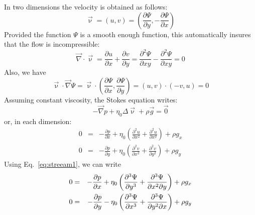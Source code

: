 In two dimensions the velocity is obtained as follows:
\begin{equation}
{\vec \upnu} = (u,v) = \left( \frac{\partial \Psi}{\partial y},-\frac{\partial \Psi}{\partial x} \right) 
\label{eq:streeam1}
\end{equation}
Provided the function $\Psi$ is a smooth enough function, 
this automatically insures that the flow is incompressible:
\begin{equation}
{\vec \nabla}\cdot {\vec \upnu} = 
\frac{\partial u}{\partial x} + \frac{\partial v}{\partial y}
=
\frac{\partial^2 \Psi}{\partial xy} - \frac{\partial^2 \Psi}{\partial xy} =0 
\end{equation}
Also, we have
\[
\vec\upnu \cdot \vec\nabla \Psi = \vec\upnu \cdot
\left( \frac{\partial \Psi}{\partial x},\frac{\partial \Psi}{\partial y} \right) 
=(u,v) \cdot (-v,u) =0
\]
Assuming constant viscosity, the Stokes equation writes:
\begin{equation}
-{\vec \nabla}p + \eta_0 \Delta {\vec \upnu} + \rho {\vec g} = \vec{0}
\end{equation}
or, in each dimension:
\begin{eqnarray}
0&=&-\frac{\partial p}{\partial x} 
+ \eta_0\left( \frac{\partial^2 u}{\partial x^2} + \frac{\partial^2 u}{\partial x^y} \right) + \rho g_x \\
0&=&-\frac{\partial p}{\partial y} 
+ \eta_0 \left(\frac{\partial^2 v}{\partial x^2} + \frac{\partial^2 v}{\partial y^2} \right) + \rho g_y 
\end{eqnarray}
Using Eq.~\eqref{eq:streeam1}, we can write 
\begin{eqnarray}
0 &=& -\frac{\partial p}{\partial x} + \eta_0 \left(
\frac{\partial^3 \Psi}{\partial y^3}  + \frac{\partial^3 \Psi}{\partial x^2 \partial y}
\right) + \rho g_x \nonumber\\
0 &=& -\frac{\partial p}{\partial y} - \eta_0 \left(
\frac{\partial^3 \Psi}{\partial x^3}  + \frac{\partial^3 \Psi}{\partial y^2 \partial x}
\right) + \rho g_y
\end{eqnarray}


